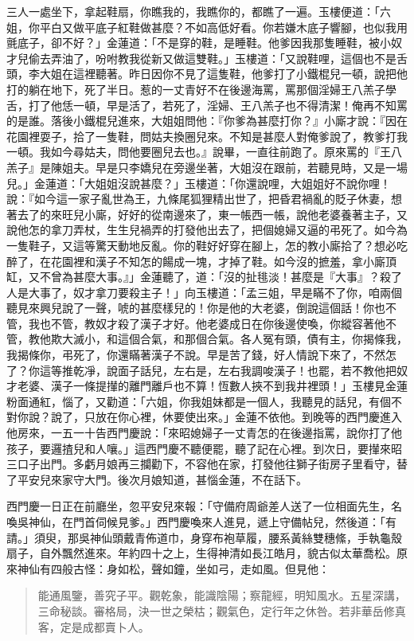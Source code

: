 三人一處坐下，拿起鞋扇，你瞧我的，我瞧你的，都瞧了一遍。玉樓便道：「六姐，你平白又做平底子紅鞋做甚麼？不如高低好看。你若嫌木底子響腳，也似我用氈底子，卻不好？」金蓮道：「不是穿的鞋，是睡鞋。他爹因我那隻睡鞋，被小奴才兒偷去弄油了，吩咐教我從新又做這雙鞋。」玉樓道：「又說鞋哩，這個也不是舌頭，李大姐在這裡聽著。昨日因你不見了這隻鞋，他爹打了小鐵棍兒一頓，說把他打的躺在地下，死了半日。惹的一丈青好不在後邊海罵，罵那個淫婦王八羔子學舌，打了他恁一頓，早是活了，若死了，淫婦、王八羔子也不得清潔！俺再不知罵的是誰。落後小鐵棍兒進來，大姐姐問他：『你爹為甚麼打你？』小廝才說：『因在花園裡耍子，拾了一隻鞋，問姑夫換圈兒來。不知是甚麼人對俺爹說了，教爹打我一頓。我如今尋姑夫，問他要圈兒去也。』說畢，一直往前跑了。原來罵的『王八羔子』是陳姐夫。早是只李嬌兒在旁邊坐著，大姐沒在跟前，若聽見時，又是一場兒。」金蓮道：「大姐姐沒說甚麼？」玉樓道：「你還說哩，大姐姐好不說你哩！說：『如今這一家子亂世為王，九條尾狐狸精出世了，把昏君禍亂的貶子休妻，想著去了的來旺兒小廝，好好的從南邊來了，東一帳西一帳，說他老婆養著主子，又說他怎的拿刀弄杖，生生兒禍弄的打發他出去了，把個媳婦又逼的弔死了。如今為一隻鞋子，又這等驚天動地反亂。你的鞋好好穿在腳上，怎的教小廝拾了？想必吃醉了，在花園裡和漢子不知怎的餳成一塊，才掉了鞋。如今沒的摭羞，拿小廝頂缸，又不曾為甚麼大事。』」金蓮聽了，道：「沒的扯毴淡！甚麼是『大事』？殺了人是大事了，奴才拿刀要殺主子！」向玉樓道：「孟三姐，早是瞞不了你，咱兩個聽見來興兒說了一聲，唬的甚麼樣兒的！你是他的大老婆，倒說這個話！你也不管，我也不管，教奴才殺了漢子才好。他老婆成日在你後邊使喚，你縱容著他不管，教他欺大滅小，和這個合氣，和那個合氣。各人冤有頭，債有主，你揭條我，我揭條你，弔死了，你還瞞著漢子不說。早是苦了錢，好人情說下來了，不然怎了？你這等推乾凈，說面子話兒，左右是，左右我調唆漢子！也罷，若不教他把奴才老婆、漢子一條提攆的離門離戶也不算！恆數人挾不到我井裡頭！」玉樓見金蓮粉面通紅，惱了，又勸道：「六姐，你我姐妹都是一個人，我聽見的話兒，有個不對你說？說了，只放在你心裡，休要使出來。」金蓮不依他。到晚等的西門慶進入他房來，一五一十告西門慶說：「來昭媳婦子一丈青怎的在後邊指罵，說你打了他孩子，要邏揸兒和人嚷。」這西門慶不聽便罷，聽了記在心裡。到次日，要攆來昭三口子出門。多虧月娘再三攔勸下，不容他在家，打發他往獅子街房子里看守，替了平安兒來家守大門。後次月娘知道，甚惱金蓮，不在話下。

西門慶一日正在前廳坐，忽平安兒來報：「守備府周爺差人送了一位相面先生，名喚吳神仙，在門首伺候見爹。」西門慶喚來人進見，遞上守備帖兒，然後道：「有請。」須臾，那吳神仙頭戴青佈道巾，身穿布袍草履，腰系黃絲雙穗絛，手執龜殼扇子，自外飄然進來。年約四十之上，生得神清如長江皓月，貌古似太華喬松。原來神仙有四般古怪：身如松，聲如鐘，坐如弓，走如風。但見他：
\begin{quote}
能通風鑒，善究子平。觀乾象，能識陰陽；察龍經，明知風水。五星深講，三命秘談。審格局，決一世之榮枯；觀氣色，定行年之休咎。若非華岳修真客，定是成都賣卜人。
\end{quote}


